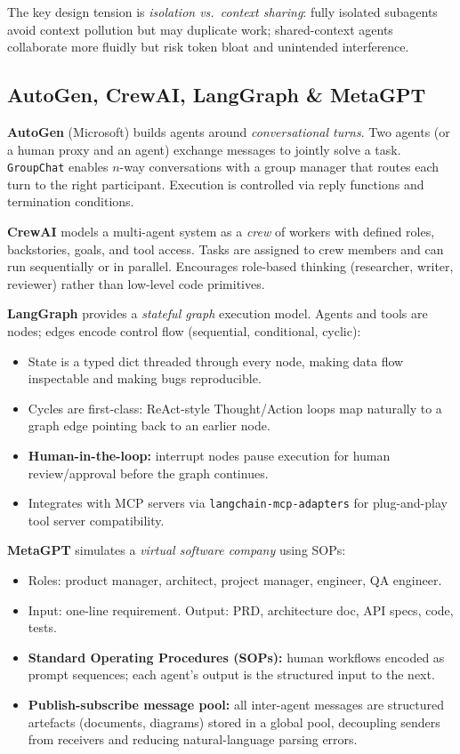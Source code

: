 The key design tension is \emph{isolation vs.\ context sharing}: fully isolated
subagents avoid context pollution but may duplicate work; shared-context agents
collaborate more fluidly but risk token bloat and unintended interference.

\subsection{AutoGen, CrewAI, LangGraph \& MetaGPT}

\textbf{AutoGen} (Microsoft) builds agents around \emph{conversational turns}. Two
agents (or a human proxy and an agent) exchange messages to jointly solve a task.
\texttt{GroupChat} enables $n$-way conversations with a group manager that routes
each turn to the right participant. Execution is controlled via reply functions and
termination conditions.

\textbf{CrewAI} models a multi-agent system as a \emph{crew} of workers with defined
roles, backstories, goals, and tool access. Tasks are assigned to crew members and
can run sequentially or in parallel. Encourages role-based thinking (researcher,
writer, reviewer) rather than low-level code primitives.

\textbf{LangGraph} provides a \emph{stateful graph} execution model. Agents and
tools are nodes; edges encode control flow (sequential, conditional, cyclic):
\begin{itemize}
  \item State is a typed dict threaded through every node, making data flow
    inspectable and making bugs reproducible.
  \item Cycles are first-class: ReAct-style Thought/Action loops map naturally to
    a graph edge pointing back to an earlier node.
  \item \textbf{Human-in-the-loop:} interrupt nodes pause execution for human
    review/approval before the graph continues.
  \item Integrates with MCP servers via \texttt{langchain-mcp-adapters} for
    plug-and-play tool server compatibility.
\end{itemize}

\textbf{MetaGPT} simulates a \emph{virtual software company} using SOPs:
\begin{itemize}
  \item Roles: product manager, architect, project manager, engineer, QA engineer.
  \item Input: one-line requirement. Output: PRD, architecture doc, API specs, code,
    tests.
  \item \textbf{Standard Operating Procedures (SOPs):} human workflows encoded as
    prompt sequences; each agent's output is the structured input to the next.
  \item \textbf{Publish-subscribe message pool:} all inter-agent messages are
    structured artefacts (documents, diagrams) stored in a global pool, decoupling
    senders from receivers and reducing natural-language parsing errors.
\end{itemize}

